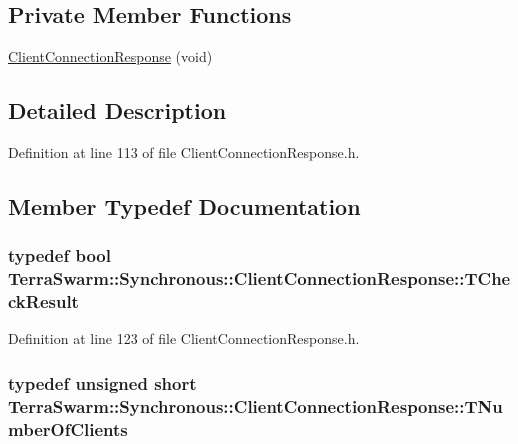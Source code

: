 \subsection*{Private Member Functions}
\begin{DoxyCompactItemize}
\item 
\hyperlink{class_terra_swarm_1_1_synchronous_1_1_client_connection_response_a478ac409364847fc12eada42064b79e3}{Client\-Connection\-Response} (void)
\end{DoxyCompactItemize}


\subsection{Detailed Description}


Definition at line 113 of file Client\-Connection\-Response.\-h.



\subsection{Member Typedef Documentation}
\hypertarget{class_terra_swarm_1_1_synchronous_1_1_client_connection_response_a33254e9e1216ca2dde89b8a66f7ad18e}{
\subsubsection[{T\-Check\-Result}]{\setlength{\rightskip}{0pt plus 5cm}typedef bool {\bf Terra\-Swarm\-::\-Synchronous\-::\-Client\-Connection\-Response\-::\-T\-Check\-Result}}}\label{class_terra_swarm_1_1_synchronous_1_1_client_connection_response_a33254e9e1216ca2dde89b8a66f7ad18e}


Definition at line 123 of file Client\-Connection\-Response.\-h.

\hypertarget{class_terra_swarm_1_1_synchronous_1_1_client_connection_response_adc391c9557f0acfdb0763043058cdf83}{
\subsubsection[{T\-Number\-Of\-Clients}]{\setlength{\rightskip}{0pt plus 5cm}typedef unsigned short {\bf Terra\-Swarm\-::\-Synchronous\-::\-Client\-Connection\-Response\-::\-T\-Number\-Of\-Clients}}}\label{class_terra_swarm_1_1_synchronous_1_1_client_connection_response_adc391c9557f0acfdb0763043058cdf83}


